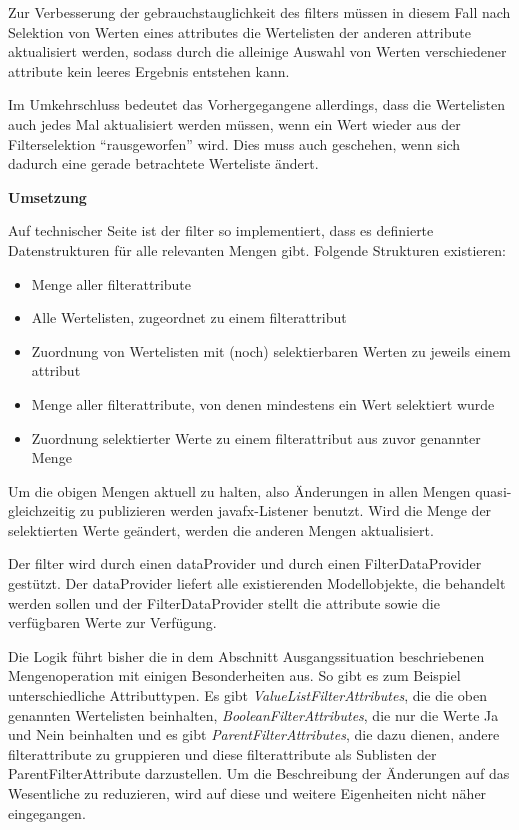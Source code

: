 Zur Verbesserung der \gls{gebrauchstauglichkeit} des \gls{filter}s müssen in diesem Fall nach Selektion von Werten eines \gls{attribut}es die Wertelisten der anderen \gls{attribut}e aktualisiert werden, sodass durch die alleinige Auswahl von Werten verschiedener \gls{attribut}e kein leeres Ergebnis entstehen kann.

Im Umkehrschluss bedeutet das Vorhergegangene allerdings, dass die Wertelisten auch jedes Mal aktualisiert werden müssen, wenn ein Wert wieder aus der Filterselektion \enquote{rausgeworfen} wird. Dies muss auch geschehen, wenn sich dadurch eine gerade betrachtete Werteliste ändert.

\textbf{Umsetzung}

Auf technischer Seite ist der \gls{filter} so implementiert, dass es definierte Datenstrukturen für alle relevanten Mengen gibt. Folgende Strukturen existieren:

\begin{itemize}
	\item Menge aller \gls{filterattribut}e
	\item Alle Wertelisten, zugeordnet zu einem \gls{filterattribut}
	\item Zuordnung von Wertelisten mit (noch) selektierbaren Werten zu jeweils einem \gls{attribut}
	\item Menge aller \gls{filterattribut}e, von denen mindestens ein Wert selektiert wurde
	\item Zuordnung selektierter Werte zu einem \gls{filterattribut} aus zuvor genannter Menge
\end{itemize}

Um die obigen Mengen aktuell zu halten, also Änderungen in allen Mengen quasi-gleichzeitig zu publizieren werden \gls{javafx}-Listener benutzt. Wird die Menge der selektierten Werte geändert, werden die anderen Mengen aktualisiert.

Der \gls{filter} wird durch einen \gls{dataProvider} und durch einen FilterDataProvider gestützt. Der \gls{dataProvider} liefert alle existierenden Modellobjekte, die behandelt werden sollen und der FilterDataProvider stellt die \gls{attribut}e sowie die verfügbaren Werte zur Verfügung.

Die Logik führt bisher die in dem Abschnitt Ausgangssituation beschriebenen Mengenoperation mit einigen Besonderheiten aus. So gibt es zum Beispiel unterschiedliche Attributtypen. Es gibt \textit{ValueListFilterAttributes}, die die oben genannten Wertelisten beinhalten, \textit{BooleanFilterAttributes}, die nur die Werte Ja und Nein beinhalten und es gibt \textit{ParentFilterAttributes}, die dazu dienen, andere \gls{filterattribut}e zu gruppieren und diese \gls{filterattribut}e als Sublisten der ParentFilterAttribute darzustellen. Um die Beschreibung der Änderungen auf das Wesentliche zu reduzieren, wird auf diese und weitere Eigenheiten nicht näher eingegangen.

